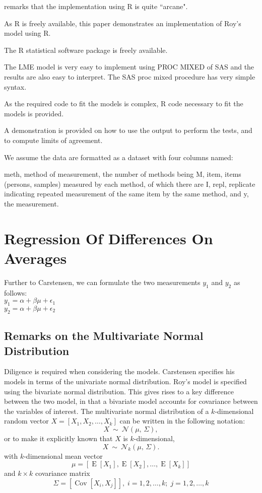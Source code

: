 \documentclass[12pt, a4paper]{article}
\theoremstyle{plain}
\theoremstyle{definition}
\theoremstyle{remark}
\begin{document}
\citet{BXC2008} remarks that the implementation using R is quite ``arcane".

As R is freely available, this paper demonstrates an implementation of Roy's model using R.

The R statistical software package is freely available.

The LME model is very easy to implement using PROC MIXED of SAS and the results are also easy to interpret.
The SAS proc mixed procedure has very simple syntax.

As the required code to fit the models is complex, R code necessary to fit the models is provided. 

A demonstration is provided on how to use the output to perform the tests, and to compute limits of agreement.



We assume the data are formatted as a dataset with four columns named:

	meth, method of measurement, the number of methods being M,
	item, items (persons, samples) measured by each method, of which there are I,
	repl, replicate indicating repeated measurement of the same item by the same method, and
	y, the measurement.





\newpage
\section{Regression Of Differences On Averages}
Further to Carstensen, we can formulate the two measurements
$y_{1}$ and $y_{2}$ as follows:
\\
$y_{1} = \alpha + \beta\mu + \epsilon_{1}$
\\
$y_{2} = \alpha + \beta\mu + \epsilon_{2}$









\newpage
\subsection{Remarks on the Multivariate Normal Distribution}

Diligence is required when considering the models. Carstensen specifies his models in terms of the univariate normal distribution. Roy's model is specified using the bivariate normal distribution.
This gives rises to a key difference between the two model, in that a bivariate model accounts for covariance between the variables of interest.
The multivariate normal distribution of a $k$-dimensional random vector $X = [X_1, X_2, \ldots, X_k]$
can be written in the following notation:
\[
    X\ \sim\ \mathcal{N}(\mu,\, \Sigma),
\]
or to make it explicitly known that $X$ is $k$-dimensional,
\[
    X\ \sim\ \mathcal{N}_k(\mu,\, \Sigma).
\]
with $k$-dimensional mean vector
\[ \mu = [ \operatorname{E}[X_1], \operatorname{E}[X_2], \ldots, \operatorname{E}[X_k]] \]
and $k \times k$ covariance matrix
\[ \Sigma = [\operatorname{Cov}[X_i, X_j]], \; i=1,2,\ldots,k; \; j=1,2,\ldots,k \]
\end{document}
